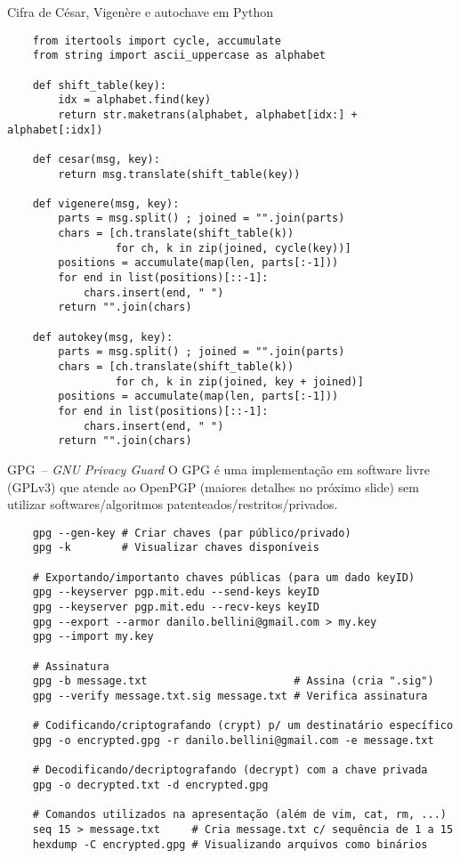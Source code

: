 \documentclass[utf8]{beamer}
\begin{document}
\begin{frame}[fragile]{Cifra de César, Vigenère e autochave em Python}
  \begin{verbatim}
    from itertools import cycle, accumulate
    from string import ascii_uppercase as alphabet

    def shift_table(key):
        idx = alphabet.find(key)
        return str.maketrans(alphabet, alphabet[idx:] + alphabet[:idx])

    def cesar(msg, key):
        return msg.translate(shift_table(key))

    def vigenere(msg, key):
        parts = msg.split() ; joined = "".join(parts)
        chars = [ch.translate(shift_table(k))
                 for ch, k in zip(joined, cycle(key))]
        positions = accumulate(map(len, parts[:-1]))
        for end in list(positions)[::-1]:
            chars.insert(end, " ")
        return "".join(chars)

    def autokey(msg, key):
        parts = msg.split() ; joined = "".join(parts)
        chars = [ch.translate(shift_table(k))
                 for ch, k in zip(joined, key + joined)]
        positions = accumulate(map(len, parts[:-1]))
        for end in list(positions)[::-1]:
            chars.insert(end, " ")
        return "".join(chars)
  \end{verbatim}
\end{frame}


\begin{frame}[fragile]{GPG~-- \emph{GNU Privacy Guard}}
  O GPG é uma implementação em software livre (GPLv3)
  que atende ao OpenPGP (maiores detalhes no próximo slide)
  sem utilizar softwares/algoritmos patenteados/restritos/privados.
  \begin{verbatim}
    gpg --gen-key # Criar chaves (par público/privado)
    gpg -k        # Visualizar chaves disponíveis

    # Exportando/importanto chaves públicas (para um dado keyID)
    gpg --keyserver pgp.mit.edu --send-keys keyID
    gpg --keyserver pgp.mit.edu --recv-keys keyID
    gpg --export --armor danilo.bellini@gmail.com > my.key
    gpg --import my.key

    # Assinatura
    gpg -b message.txt                       # Assina (cria ".sig")
    gpg --verify message.txt.sig message.txt # Verifica assinatura

    # Codificando/criptografando (crypt) p/ um destinatário específico
    gpg -o encrypted.gpg -r danilo.bellini@gmail.com -e message.txt

    # Decodificando/decriptografando (decrypt) com a chave privada
    gpg -o decrypted.txt -d encrypted.gpg

    # Comandos utilizados na apresentação (além de vim, cat, rm, ...)
    seq 15 > message.txt     # Cria message.txt c/ sequência de 1 a 15
    hexdump -C encrypted.gpg # Visualizando arquivos como binários
  \end{verbatim}
\end{frame}
\end{document}
